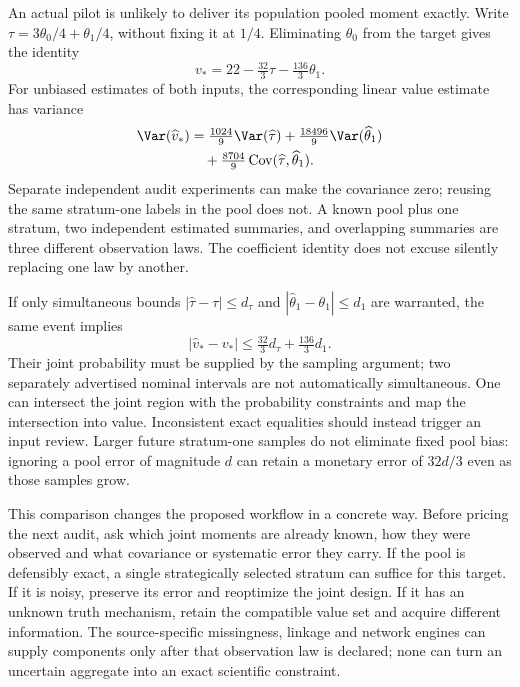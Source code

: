 An actual pilot is unlikely to deliver its population pooled moment exactly.
Write $\tau=3\theta_0/4+\theta_1/4$, without fixing it at $1/4$.
Eliminating $\theta_0$ from the target gives the identity
\begin{equation}
 v_*=22-\tfrac{32}{3}\tau-\tfrac{136}{3}\theta_1.
 \label{exec17:s7-noisy-value}
\end{equation}
For unbiased estimates of both inputs, the corresponding linear value
estimate has variance
\begin{equation}
 \begin{split}
  \Var(\widehat v_*)&=\tfrac{1024}{9}\Var(\widehat\tau)
       +\tfrac{18496}{9}\Var(\widehat\theta_1)\\
       &\quad+\tfrac{8704}{9}
          \operatorname{Cov}(\widehat\tau,\widehat\theta_1).
 \end{split}
 \label{exec17:s7-noisy-variance}
\end{equation}
Separate independent audit experiments can make the covariance zero; reusing
the same stratum-one labels in the pool does not. A known pool plus one
stratum, two independent estimated summaries, and overlapping summaries are
three different observation laws. The coefficient identity does not excuse
silently replacing one law by another.

If only simultaneous bounds $|\widehat\tau-\tau|\leq d_\tau$ and
$|\widehat\theta_1-\theta_1|\leq d_1$ are warranted, the same event implies
\begin{equation}
 |\widehat v_*-v_*|\leq\tfrac{32}{3}d_\tau+
                            \tfrac{136}{3}d_1.
 \label{exec17:s7-noisy-envelope}
\end{equation}
Their joint probability must be supplied by the sampling argument; two
separately advertised nominal intervals are not automatically simultaneous.
One can intersect the joint region with the probability constraints and map
the intersection into value. Inconsistent exact equalities should instead
trigger an input review. Larger future stratum-one samples do not eliminate
fixed pool bias: ignoring a pool error of magnitude $d$ can retain a monetary
error of $32d/3$ even as those samples grow.

This comparison changes the proposed workflow in a concrete way. Before
pricing the next audit, ask which joint moments are already known, how they
were observed and what covariance or systematic error they carry. If the
pool is defensibly exact, a single strategically selected stratum can suffice
for this target. If it is noisy, preserve its error and reoptimize the joint
design. If it has an unknown truth mechanism, retain the compatible value
set and acquire different information. The source-specific missingness,
linkage and network engines can supply components only after that observation
law is declared; none can turn an uncertain aggregate into an exact scientific
constraint.~\citep{exec17_s7_extension}


